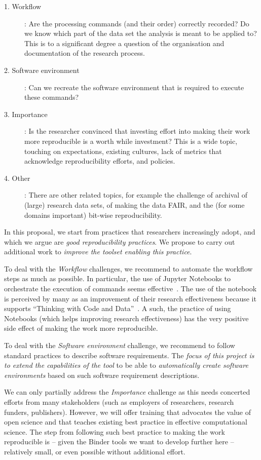 \begin{description}
\item[1. Workflow]: Are the processing commands (and their order)
correctly recorded? Do we know which part of the data set the analysis is meant
to be applied to? This is to a significant degree a question of the organisation
and documentation of the research process.

\item[2. Software environment]: Can we recreate the software environment that is
required to execute these commands?

\item[3. Importance]: Is the researcher convinced that investing effort into making
their work more reproducible is a worth while investment? This is a wide topic,
touching on expectations, existing cultures, lack of metrics that acknowledge
reproducibility efforts, and policies.

\item[4. Other]: There are other related topics, for example the challenge of
archival of (large) research data sets, of making the data FAIR, and the (for
some domains important) bit-wise reproducibility.
\end{description}

In this proposal, we start from practices that researchers increasingly adopt,
and which we argue are \emph{good reproducibility practices}. We propose to carry
out additional work to \emph{improve the toolset enabling this practice}.

To deal with the \emph{Workflow} challenges, we recommend to automate the
workflow steps as much as possible. In particular, the use of Jupyter Notebooks
to orchestrate the execution of commands seems effective~\cite{Beg2021}.
The use of the notebook is
perceived by many as an improvement of their research effectiveness because
it supports ``Thinking with Code and Data''~\cite{Granger2021}. A such, the
practice of using Notebooks (which helps improving research effectiveness) has
the very positive side effect of making the work more reproducible.


To deal with the \emph{Software environment} challenge, we recommend to follow
standard practices to describe software requirements. The \emph{focus of this
project is to extend the capabilities of the \repotodocker{} tool} to be able to
\emph{automatically create software environments} based on such software
requirement descriptions.

We can only partially address the \emph{Importance} challenge as this needs
concerted efforts from many stakeholders (such as employers of researchers,
research funders, publishers). However, we will offer training that advocates
the value of open science and that teaches existing best practice in
effective computational science. The step from following such best practice to
making the work reproducible is -- given the Binder tools we want to develop
further here -- relatively small, or even possible without additional effort.

